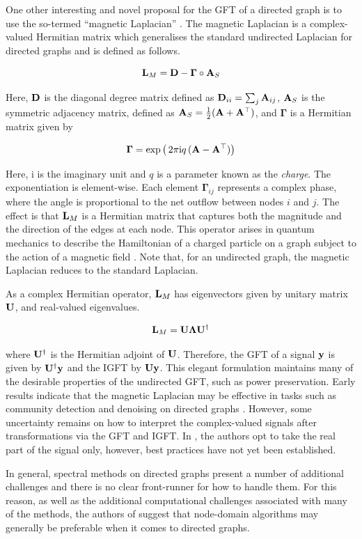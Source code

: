 One other interesting and novel proposal for the GFT of a directed graph is to use the so-termed ``magnetic Laplacian'' \citep{DeResende2020, Zhang2021}. The magnetic Laplacian is a complex-valued Hermitian matrix which generalises the standard undirected Laplacian for directed graphs and is defined as follows. 

\begin{equation}
    \mathbf{L}_M = \mathbf{D} - \boldsymbol{\Gamma} \circ \mathbf{A}_S
\end{equation}

Here, $\mathbf{D}$ is the diagonal degree matrix defined as $\mathbf{D}_{ii} = \sum_{j} \mathbf{A}_{ij}$, $\mathbf{A}_S$ is the symmetric adjacency matrix, defined as $\mathbf{A}_S = \frac{1}{2} (\mathbf{A} + \mathbf{A}^\top)$, and $\boldsymbol{\Gamma}$ is a Hermitian matrix given by 

\begin{equation}
    \boldsymbol{\Gamma} = \exp\big( \,2 \pi \text{i} q \, (\mathbf{A} - \mathbf{A}^\top)\big)
\end{equation}

Here, i is the imaginary unit and $q$ is a parameter known as the \textit{charge}. The exponentiation is element-wise. Each element $\boldsymbol{\Gamma}_{ij}$ represents a complex phase, where the angle is proportional to the net outflow between nodes $i$ and $j$. The effect is that $\mathbf{L}_M$ is a Hermitian matrix that captures both the magnitude and the direction of the edges at each node. This operator arises in quantum mechanics to describe the Hamiltonian of a charged particle on a graph subject to the action of a magnetic field \citep{Shubin1994}. Note that, for an undirected graph, the magnetic Laplacian reduces to the standard Laplacian. 

As a complex Hermitian operator, $\mathbf{L}_M$ has eigenvectors given by unitary matrix $\mathbf{U}$, and real-valued eigenvalues. 

\begin{equation}
    \mathbf{L}_M = \mathbf{U} \mathbf{\Lambda} \mathbf{U}^\dagger
\end{equation}

where $\mathbf{U}^\dagger$ is the Hermitian adjoint of $\mathbf{U}$. Therefore, the GFT of a signal $\mathbf{y}$ is given by $\mathbf{U}^\dagger \mathbf{y}$ and the IGFT by $\mathbf{U}\mathbf{y}$. This elegant formulation maintains many of the desirable properties of the undirected GFT, such as power preservation. Early results indicate that the magnetic Laplacian may be effective in tasks such as community detection and denoising on directed graphs \citep{Furutani2020, Fanuel2017}. However, some uncertainty remains on how to interpret the complex-valued signals after transformations via the GFT and IGFT. In \cite{Furutani2020}, the authors opt to take the real part of the signal only, however, best practices have not yet been established. 

In general, spectral methods on directed graphs present a number of additional challenges and there is no clear front-runner for how to handle them. For this reason, as well as the additional computational challenges associated with many of the methods, the authors of \cite{Marques2020} suggest that node-domain algorithms may generally be preferable when it comes to directed graphs. 

